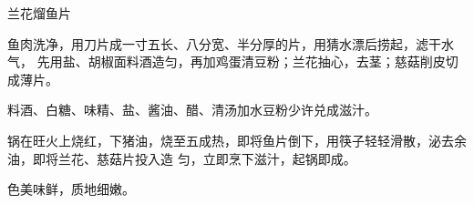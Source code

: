 \begin{recipe}{兰花熘鱼片}

\ingredients


\preparation

\step 鱼肉洗净，用刀片成一寸五长、八分宽、半分厚的片，用猜水漂后捞起，滤干水气，
先用盐、胡椒面料酒造匀，再加鸡蛋清豆粉；兰花抽心，去茎；慈菇削皮切成薄片。

\step 料酒、白糖、味精、盐、酱油、醋、清汤加水豆粉少许兑成滋汁。

\step 锅在旺火上烧红，下猪油，烧至五成热，即将鱼片倒下，用筷子轻轻滑散，泌去余
油，即将兰花、慈菇片投入造 匀，立即烹下滋汁，起锅即成。

\features

色美味鲜，质地细嫩。

\end{recipe}

